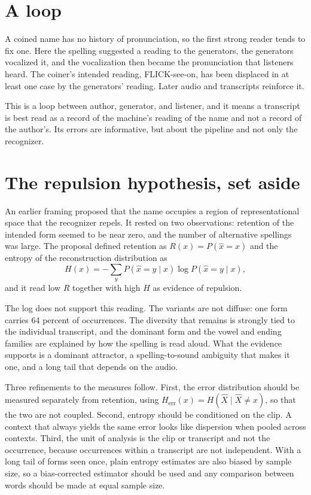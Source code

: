 \documentclass[11pt]{article}
\begin{document}
\section{A loop}

A coined name has no history of pronunciation, so the first strong reader tends to fix one. Here the spelling suggested a reading to the generators, the generators vocalized it, and the vocalization then became the pronunciation that listeners heard. The coiner's intended reading, FLICK-see-on, has been displaced in at least one case by the generators' reading. Later audio and transcripts reinforce it.

This is a loop between author, generator, and listener, and it means a transcript is best read as a record of the machine's reading of the name and not a record of the author's. Its errors are informative, but about the pipeline and not only the recognizer.

\section{The repulsion hypothesis, set aside}
\label{sec:repulsion}

An earlier framing proposed that the name occupies a region of representational space that the recognizer repels. It rested on two observations: retention of the intended form seemed to be near zero, and the number of alternative spellings was large. The proposal defined retention as $R(x)=P(\hat{x}=x)$ and the entropy of the reconstruction distribution as
\[
H(x)=-\sum_{y}P(\hat{x}=y\mid x)\log P(\hat{x}=y\mid x),
\]
and it read low $R$ together with high $H$ as evidence of repulsion.

The log does not support this reading. The variants are not diffuse: one form carries 64 percent of occurrences. The diversity that remains is strongly tied to the individual transcript, and the dominant form and the vowel and ending families are explained by how the spelling is read aloud. What the evidence supports is a dominant attractor, a spelling-to-sound ambiguity that makes it one, and a long tail that depends on the audio.

Three refinements to the measures follow. First, the error distribution should be measured separately from retention, using $H_{\mathrm{err}}(x)=H(\hat{X}\mid\hat{X}\neq x)$, so that the two are not coupled. Second, entropy should be conditioned on the clip. A context that always yields the same error looks like dispersion when pooled across contexts. Third, the unit of analysis is the clip or transcript and not the occurrence, because occurrences within a transcript are not independent. With a long tail of forms seen once, plain entropy estimates are also biased by sample size, so a bias-corrected estimator should be used and any comparison between words should be made at equal sample size.
\end{document}
